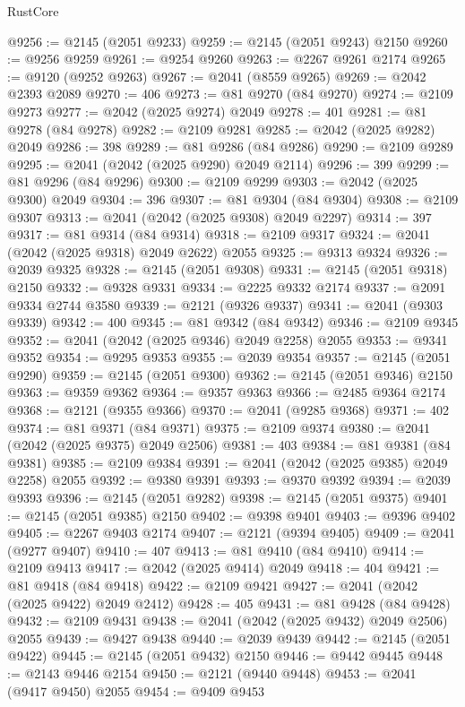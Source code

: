 \begin{lexlean}{RustCore}
\begin{coremodule}
@9256 := @2145 (@2051 @9233)
@9259 := @2145 (@2051 @9243) @2150
@9260 := @9256 @9259
@9261 := @9254 @9260
@9263 := @2267 @9261 @2174
@9265 := @9120 (@9252 @9263)
@9267 := @2041 (@8559 @9265)
@9269 := @2042 @2393 @2089
@9270 := 406
@9273 := @81 @9270 (@84 @9270)
@9274 := @2109 @9273
@9277 := @2042 (@2025 @9274) @2049
@9278 := 401
@9281 := @81 @9278 (@84 @9278)
@9282 := @2109 @9281
@9285 := @2042 (@2025 @9282) @2049
@9286 := 398
@9289 := @81 @9286 (@84 @9286)
@9290 := @2109 @9289
@9295 := @2041 (@2042 (@2025 @9290) @2049 @2114)
@9296 := 399
@9299 := @81 @9296 (@84 @9296)
@9300 := @2109 @9299
@9303 := @2042 (@2025 @9300) @2049
@9304 := 396
@9307 := @81 @9304 (@84 @9304)
@9308 := @2109 @9307
@9313 := @2041 (@2042 (@2025 @9308) @2049 @2297)
@9314 := 397
@9317 := @81 @9314 (@84 @9314)
@9318 := @2109 @9317
@9324 := @2041 (@2042 (@2025 @9318) @2049 @2622) @2055
@9325 := @9313 @9324
@9326 := @2039 @9325
@9328 := @2145 (@2051 @9308)
@9331 := @2145 (@2051 @9318) @2150
@9332 := @9328 @9331
@9334 := @2225 @9332 @2174
@9337 := @2091 @9334 @2744 @3580
@9339 := @2121 (@9326 @9337)
@9341 := @2041 (@9303 @9339)
@9342 := 400
@9345 := @81 @9342 (@84 @9342)
@9346 := @2109 @9345
@9352 := @2041 (@2042 (@2025 @9346) @2049 @2258) @2055
@9353 := @9341 @9352
@9354 := @9295 @9353
@9355 := @2039 @9354
@9357 := @2145 (@2051 @9290)
@9359 := @2145 (@2051 @9300)
@9362 := @2145 (@2051 @9346) @2150
@9363 := @9359 @9362
@9364 := @9357 @9363
@9366 := @2485 @9364 @2174
@9368 := @2121 (@9355 @9366)
@9370 := @2041 (@9285 @9368)
@9371 := 402
@9374 := @81 @9371 (@84 @9371)
@9375 := @2109 @9374
@9380 := @2041 (@2042 (@2025 @9375) @2049 @2506)
@9381 := 403
@9384 := @81 @9381 (@84 @9381)
@9385 := @2109 @9384
@9391 := @2041 (@2042 (@2025 @9385) @2049 @2258) @2055
@9392 := @9380 @9391
@9393 := @9370 @9392
@9394 := @2039 @9393
@9396 := @2145 (@2051 @9282)
@9398 := @2145 (@2051 @9375)
@9401 := @2145 (@2051 @9385) @2150
@9402 := @9398 @9401
@9403 := @9396 @9402
@9405 := @2267 @9403 @2174
@9407 := @2121 (@9394 @9405)
@9409 := @2041 (@9277 @9407)
@9410 := 407
@9413 := @81 @9410 (@84 @9410)
@9414 := @2109 @9413
@9417 := @2042 (@2025 @9414) @2049
@9418 := 404
@9421 := @81 @9418 (@84 @9418)
@9422 := @2109 @9421
@9427 := @2041 (@2042 (@2025 @9422) @2049 @2412)
@9428 := 405
@9431 := @81 @9428 (@84 @9428)
@9432 := @2109 @9431
@9438 := @2041 (@2042 (@2025 @9432) @2049 @2506) @2055
@9439 := @9427 @9438
@9440 := @2039 @9439
@9442 := @2145 (@2051 @9422)
@9445 := @2145 (@2051 @9432) @2150
@9446 := @9442 @9445
@9448 := @2143 @9446 @2154
@9450 := @2121 (@9440 @9448)
@9453 := @2041 (@9417 @9450) @2055
@9454 := @9409 @9453

\end{coremodule}
\end{lexlean}
